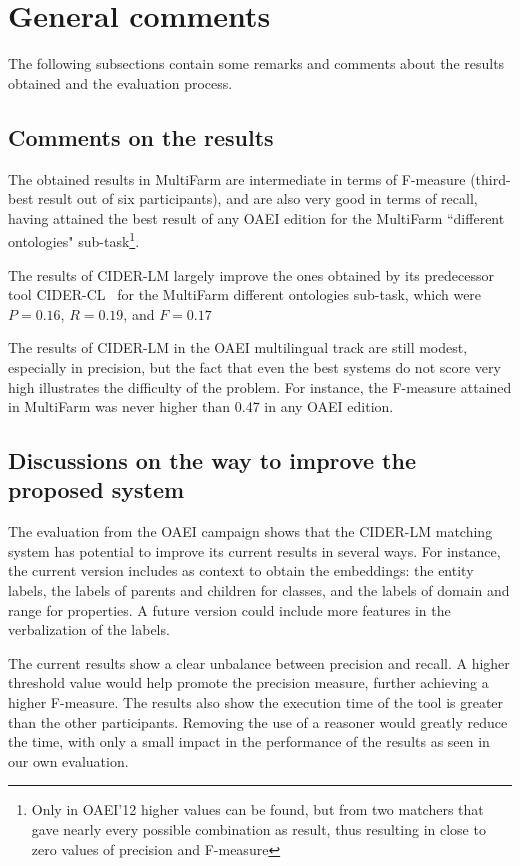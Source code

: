 \documentclass[
]{ceurart}
\begin{document}
\section{General comments}

The following subsections contain some remarks and comments about the results obtained and the evaluation process.

\subsection{Comments on the results}

The obtained results in MultiFarm are intermediate in terms of F-measure (third-best result out of six participants), and are also very good in terms of recall, having attained the best result of any OAEI edition for the MultiFarm ``different ontologies" sub-task\footnote{Only in OAEI'12 higher values can be found, but from two matchers that gave nearly every possible combination as result, thus resulting in close to zero values of precision and F-measure}.

The results of CIDER-LM largely improve the ones obtained by its predecessor tool CIDER-CL~\cite{Gracia2013cidercl} for the MultiFarm different ontologies sub-task, which were $P = 0.16$, $R = 0.19$, and $F = 0.17$

The results of CIDER-LM in the OAEI multilingual track are still modest, especially in precision, but the fact that even the best systems do not score very high illustrates the difficulty of the problem. For instance, the F-measure attained in MultiFarm was never higher than 0.47 in any OAEI edition.  

\subsection{Discussions on the way to improve the proposed system}

The evaluation from the OAEI campaign shows that the CIDER-LM matching system has potential to improve its current results in several ways. For instance, the current version includes as context to obtain the embeddings: the entity labels, the labels of parents and children for classes, and the labels of domain and range for properties. A future version could include more features in the verbalization of the labels. 

The current results show a clear unbalance between precision and recall. A higher threshold value would help promote the precision measure, further achieving a higher F-measure. The results also show the execution time of the tool is greater than the other participants. Removing the use of a reasoner would greatly reduce the time, with only a small impact in the performance of the results as seen in our own evaluation.
\end{document}
